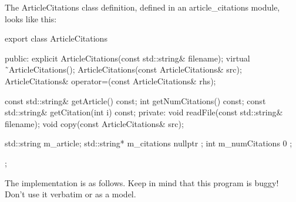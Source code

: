 The ArticleCitations class definition, defined in an article\_citations module, looks like this:

\begin{cpp}
export class ArticleCitations
{
    public:
        explicit ArticleCitations(const std::string& filename);
        virtual ˜ArticleCitations();
        ArticleCitations(const ArticleCitations& src);
        ArticleCitations& operator=(const ArticleCitations& rhs);

        const std::string& getArticle() const;
        int getNumCitations() const;
        const std::string& getCitation(int i) const;
    private:
        void readFile(const std::string& filename);
        void copy(const ArticleCitations& src);

        std::string m_article;
        std::string* m_citations { nullptr };
        int m_numCitations { 0 };
};
\end{cpp}

The implementation is as follows. Keep in mind that this program is buggy! Don’t use it verbatim or as a model.

